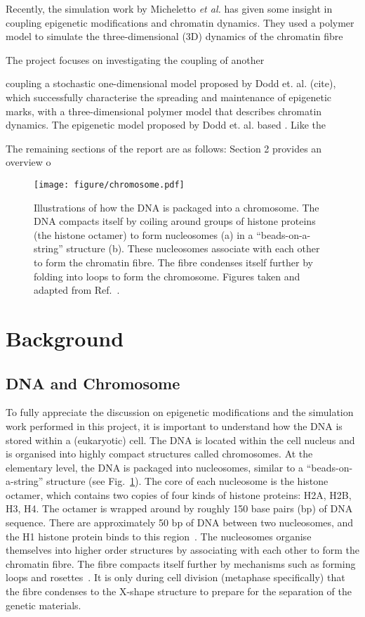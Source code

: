 \documentclass[12pt]{article}
\newcommand{\etal}{\emph{et al.}}
\begin{document}
Recently, the simulation work by Micheletto \etal \cite{michieletto2016} has given some insight in coupling epigenetic modifications and chromatin dynamics. They used a polymer model to simulate the three-dimensional (3D) dynamics of the chromatin fibre 

The project focuses on investigating the coupling of another 

coupling a stochastic one-dimensional model proposed by Dodd et. al. (cite), which successfully characterise the spreading and maintenance of epigenetic marks, with a three-dimensional polymer model that describes chromatin dynamics. The epigenetic model proposed by Dodd et. al. based . Like the  

The remaining sections of the report are as follows: Section 2 provides an overview o

\pagebreak
\begin{figure}[h]
\centering
\texttt{[image: figure/chromosome.pdf]}
\caption{Illustrations of how the DNA is packaged into a chromosome. The DNA compacts itself by coiling around groups of histone proteins (the histone octamer) to form nucleosomes (a) in a ``beads-on-a-string'' structure (b). These nucleosomes associate with each other to form the chromatin fibre. The fibre condenses itself further by folding into loops to form the chromosome. Figures taken and adapted from Ref.~\cite{molcellbiobook}.}
\label{fig:chromosome}
\end{figure}
\section{Background}
\subsection{DNA and Chromosome}
To fully appreciate the discussion on epigenetic modifications and the simulation work performed in this project, it is important to understand how the DNA is stored within a (eukaryotic) cell. The DNA is located within the cell nucleus and is organised into highly compact structures called chromosomes. At the elementary level, the DNA is packaged into nucleosomes, similar to a ``beads-on-a-string'' structure (see Fig.~\ref{fig:chromosome}). The core of each nucleosome is the histone octamer, which contains two copies of four kinds of histone proteins: H2A, H2B, H3, H4. The octamer is wrapped around by roughly 150 base pairs (bp) of DNA sequence. There are approximately 50 bp of DNA between two nucleosomes, and the H1 histone protein binds to this region~\cite{DNABook, molcellbiobook}. The nucleosomes organise themselves into higher order structures by associating with each other to form the chromatin fibre. The fibre compacts itself further by mechanisms such as forming loops and rosettes~\cite{brackley2016}. It is only during cell division (metaphase specifically) that the fibre condenses to the X-shape structure to prepare for the separation of the genetic materials.  
\end{document}

